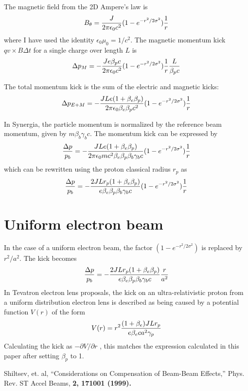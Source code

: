 \documentclass[acus]{jacow}
\begin{document}
The magnetic field from the 2D Ampere's law is
$$
B_\theta = {  J \over {2 \pi \epsilon_0 c^2}} ( 1 - e^{-{{r^2} / {2 \sigma^2}}} )  {1 \over r}
$$
where I have used the identity $\epsilon_0 \mu_0 = 1/c^2$.
The magnetic momentum kick $q v \times B \Delta t$ for a single charge over length $L$ is
$$
\Delta p_M = - {  J e \beta_p c \over {2 \pi \epsilon_0 c^2}} ( 1 - e^{-{{r^2} / {2 \sigma^2}}} )  {1 \over r}{ L \over { \beta_p c }}
$$

The total momentum kick is the sum of the electric and magnetic kicks:
$$
\Delta p_{E+M} = - {  J L e (1 + \beta_e \beta_p) \over {2 \pi \epsilon_0 \beta_e \beta_p c^2}} ( 1 - e^{-{{r^2} / {2 \sigma^2}}} ) {1 \over r}
$$

In Synergia, the particle momentum is normalized by the reference beam momentum, given by $m \beta_b \gamma_b c$.
The momentum kick can be expressed by
$$
{\Delta p \over p_b} = - {  J L e (1 + \beta_e \beta_p) \over {2 \pi \epsilon_0 m c^2 \beta_e \beta_p \beta_b \gamma_b c}} ( 1 - e^{-{{r^2} / {2 \sigma^2}}} ) {1 \over r}
$$
which can be rewritten using the proton classical radius $r_p$ as
$$
{\Delta p \over p_b} = - {  2 J L r_p (1 + \beta_e \beta_p) \over {e \beta_e \beta_p \beta_b \gamma_b c}} ( 1 - e^{-{{r^2} / {2 \sigma^2}}} ) {1 \over r}
$$

\section{Uniform electron beam}
In the case of a uniform electron beam, the factor $( 1 - e^{-{{r^2} / {2 \sigma^2}}} )$ is replaced by
$r^2/a^2$.
The kick becomes
$$
{\Delta p \over p_b} = - {  2 J L r_p (1 + \beta_e \beta_p) \over {e \beta_e \beta_p \beta_b \gamma_b c}} {r \over a^2}
$$
In Tevatron electron lens proposals\cite{shiltsev}, the kick on an ultra-relativistic proton from a
uniform distribution electron lens is described as being caused by a
potential function $V(r)$ of the form
$$
V(r) = r^2 {{(1 + \beta_e ) J L r_p } \over {e \beta_e c a^2 \gamma_p}}
$$
Calculating the kick as $ -\partial V / \partial r $ , this matches the  expression calculated
in this paper after
setting $\beta_p$ to 1.

\begin{thebibliography}{9}   %
  Shiltsev, et. al, ``Considerations on Compensation of Beam-Beam Effects,''
  Phys. Rev. ST Accel Beams, \bf{2}, 171001 (1999).
\end{thebibliography}
\end{document}
